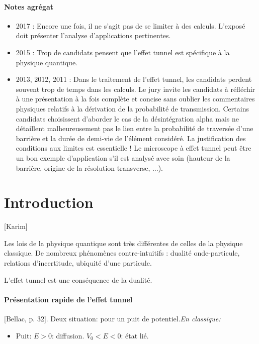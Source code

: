 \documentclass[11pt]{report}
\numberwithin{figure}{section}
\numberwithin{equation}{section}
\numberwithin{table}{section}
\newcommand{\1}{\boldsymbol{1}}
\begin{document}
\paragraph*{Notes agrégat}
\begin{itemize}
\item 2017 : Encore une fois, il ne s’agit pas de se limiter à des calculs. L’exposé doit présenter l’analyse d’applications pertinentes.
\item 2015 : Trop de candidats pensent que l’effet tunnel est spécifique à la physique quantique.
\item 2013, 2012, 2011 : Dans le traitement de l’effet tunnel, les candidats perdent souvent trop de temps dans les calculs. Le jury invite les candidats à réfléchir à une présentation à la fois complète et concise sans oublier les commentaires physiques relatifs à la dérivation de la probabilité de transmission. Certains candidats choisissent d’aborder le cas de la
désintégration alpha mais ne détaillent malheureusement pas le lien entre la probabilité de traversée d’une barrière et la durée de demi-vie de l’élément considéré. La justification des conditions aux limites est essentielle ! Le microscope à effet tunnel peut être un bon exemple d’application s'il est analysé avec soin (hauteur de la barrière, origine de la résolution transverse, ...).
\end{itemize}

\section*{Introduction}
  
[Karim]
  
Les lois de la physique quantique sont très différentes de celles de la physique classique. De nombreux phénomènes contre-intuitifs : dualité onde-particule, relations d'incertitude, ubiquité d'une particule.

L'effet tunnel est une conséquence de la dualité.

\paragraph{Présentation rapide de l'effet tunnel} [Bellac, p. 32]. Deux situation: pour un puit de potentiel.\emph{En classique:}
\begin{itemize}
\item Puit: $E>0$: diffusion. $V_0<E<0$: état lié.
\end{itemize}
\end{document}
